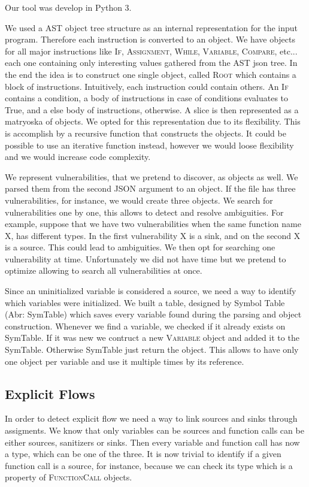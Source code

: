 Our tool was develop in Python 3.

We used a AST object tree structure as an internal representation for the input program. Therefore
each instruction is converted to an object. We have objects for all major instructions like \textsc{If},
\textsc{Assignment}, \textsc{While}, \textsc{Variable}, \textsc{Compare}, etc... each one containing
only interesting values gathered from the AST json tree.
In the end the idea is to construct one single object, called \textsc{Root} which contains a block of instructions.
Intuitively, each instruction could contain others. An \textsc{If} contains a condition, a body of instructions
in case of conditions evaluates to True, and a else body of instructions, otherwise. A slice is then represented
as a matryoska of objects. We opted for this representation due to its flexibility. This is
accomplish by a recursive function that constructs the objects. It could be possible to use an iterative
function instead, however we would loose flexibility and we would increase code complexity.

We represent vulnerabilities, that we pretend to discover, as objects as well. We parsed them from the 
second JSON argument to an object. If the file has three vulnerabilities, for instance, we would create
three objects. We search for vulnerabilities one by one, this allows to detect and resolve ambiguities.
For example, suppose that we have two vulnerabilities when the same function name X, has different types.
In the first vulnerability X is a sink, and on the second X is a source. This could lead to ambiguities.
We then opt for searching one vulnerability at time. Unfortunately we did not have time but we pretend
to optimize allowing to search all vulnerabilities at once.

Since an uninitialized variable is considered a source, we need a way to identify which variables were
initialized. We built a table, designed by Symbol Table (Abr: SymTable) which saves every variable found
during the parsing and object construction.
Whenever we find a variable, we checked if it already exists on SymTable. If it was new we contruct a
new \textsc{Variable} object and added it to the SymTable. Otherwise SymTable just return the object.
This allows to have only one object per variable and use it multiple times by its reference.

\subsection*{Explicit Flows}
In order to detect explicit flow we need a way to link sources and sinks through assigments.
We know that only variables can be sources and function calls can be either sources, sanitizers or sinks.
Then every variable and function call has now a type, which can be one of the three. It is now trivial
to identify if a given function call is a source, for instance, because we can check its type which is a
property of \textsc{FunctionCall} objects.

